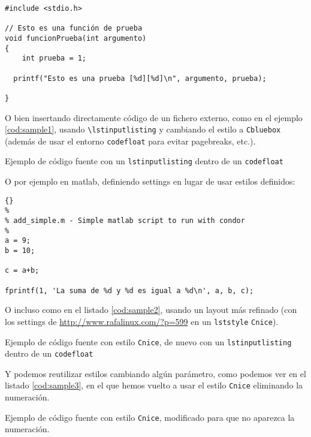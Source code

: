 \begin{lstlisting}[style=CppExample]
#include <stdio.h>

// Esto es una función de prueba
void funcionPrueba(int argumento)
{	
	int prueba = 1;

  printf("Esto es una prueba [%d][%d]\n", argumento, prueba);

}
\end{lstlisting}

O bien insertando directamente código de un fichero externo, como en el
ejemplo \ref{cod:sample1}, usando
\texttt{\textbackslash{}lstinputlisting} y cambiando el estilo a
\texttt{Cbluebox} (además de usar el entorno \texttt{codefloat} para
evitar pagebreaks, etc.).

\begin{codefloat}

\caption{Ejemplo de código fuente con un \texttt{lstinputlisting} dentro
de un \texttt{codefloat}}
\label{cod:sample1}
\end{codefloat}


O por ejemplo en matlab, definiendo settings en lugar de usar estilos
definidos:

\lstset{language=matlab}
\lstset{tabsize=2}
\lstset{commentstyle=\textit}
\lstset{stringstyle=\ttfamily, basicstyle=\small}
\begin{lstlisting}[frame=trbl]{}
%
% add_simple.m - Simple matlab script to run with condor
%
a = 9;
b = 10;

c = a+b;

fprintf(1, 'La suma de %d y %d es igual a %d\n', a, b, c);
\end{lstlisting}

O incluso como en el listado \ref{cod:sample2}, usando un layout más refinado (con
los settings de \url{http://www.rafalinux.com/?p=599} en un \texttt{lststyle}
\texttt{Cnice}).


\begin{codefloat}

\caption{Ejemplo de código fuente con estilo \texttt{Cnice}, de nuevo
  con un \texttt{lstinputlisting} dentro de un \texttt{codefloat}}
\label{cod:sample2}
\end{codefloat}

Y podemos reutilizar estilos cambiando algún parámetro, como podemos ver
en el listado \ref{cod:sample3}, en el que hemos vuelto a usar el estilo
\texttt{Cnice} eliminando la numeración.


\begin{codefloat}

\caption{Ejemplo de código fuente con estilo \texttt{Cnice}, modificado
para que no aparezca la numeración.}
\label{cod:sample3}
\end{codefloat}



